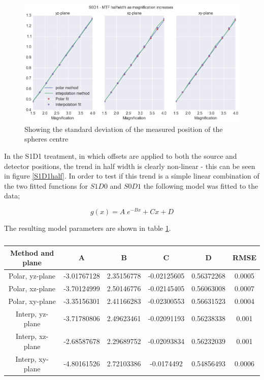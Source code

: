 \documentclass[
  twoside,
  11pt, a4paper,
  footinclude=true,
  headinclude=true,
  cleardoublepage=empty
]{scrbook}
\begin{document}
\begin{figure}[h!]
  \centering
    \includegraphics[width=\textwidth]{figures/S0D1mtf.png}
    \caption{Showing the standard deviation of the measured position of the spheres centre}
        \label{S0D1half}
\end{figure}

In the S1D1 treatment, in which offsets are applied to both the source and detector positions, the trend in half width is clearly non-linear - this can be seen in figure \ref{S1D1half}. In order to test if this trend is a simple linear combination of the two fitted functions for $S1D0$ and $S0D1$ the following model was fitted to the data;

\[
g(x) = A \; e^{-Bx} + Cx + D
\]

The resulting model parameters are shown in table \ref{explinhalffit}.

\begin{table}
\caption{}
\label{explinhalffit}
\begin{tabular}{c|ccccc}
\toprule
{} Method and plane &     A &     B  & C & D&  RMSE\\
\midrule
Polar, yz-plane     &    -3.01767128 & 2.35156778 & -0.02125605 & 0.56372268 & 0.0005\\
Polar, xz-plane     &   -3.70124999 & 2.50146776 & -0.02145405 & 0.56063008 & 0.0007\\
Polar, xy-plane     & -3.35156301 & 2.41166283 & -0.02300553 & 0.56631523 & 0.0004\\
Interp, yz-plane     & -3.71780806 & 2.49623461 & -0.02091193 & 0.56238338 & 0.001\\
Interp, xz-plane     &  -2.68587678 & 2.29689752 & -0.02093834 & 0.56232039 & 0.001\\
Interp, xy-plane     &  -4.80161526 & 2.72103386 & -0.0174492  & 0.54856493 & 0.0006\\
\bottomrule
\end{tabular}
\end{table}
\end{document}

